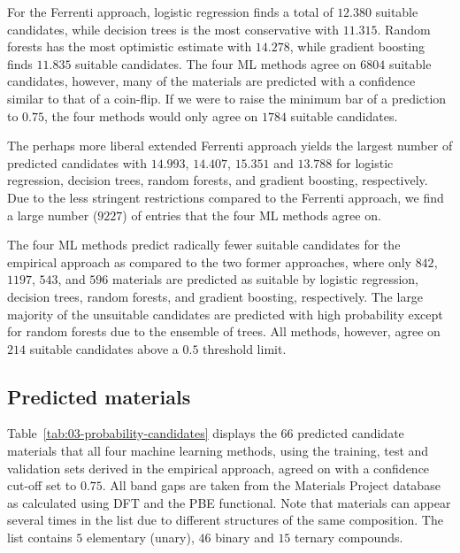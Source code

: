 \documentclass[superscriptaddress,unsortedaddress,
 amsmath,amssymb,
 aps,
]{revtex4-2}
\begin{document}
For the Ferrenti approach, logistic regression finds a total of $12.380$ suitable candidates, while decision trees is the most conservative with $11.315$. Random forests has the most optimistic estimate with $14.278$, while gradient boosting finds $11.835$ suitable candidates. The four ML methods agree on $6804$ suitable candidates,  however, many of the materials are predicted with a confidence similar to that of a coin-flip.
If we were to raise the minimum bar of a prediction to  
$0.75$, the four methods would only agree on $1784$ suitable candidates. 

The perhaps more liberal extended Ferrenti approach yields the largest number of predicted candidates with $14.993$, $14.407$, $15.351$ and $13.788$ for logistic regression, decision trees, random forests, and gradient boosting, respectively. Due to the less stringent restrictions compared to the Ferrenti approach, we find a large number ($9227$) of entries that the four ML methods  agree on.

The four ML methods predict radically fewer suitable candidates for the empirical approach as compared to the two former approaches, where only $842$, $1197$, $543$, and $596$ materials are predicted as suitable by logistic regression, decision trees, random forests, and gradient boosting, respectively. The large majority of the unsuitable candidates are predicted with high probability except for random forests due to the ensemble of trees. All methods, however, agree on $214$ suitable candidates above a $0.5$ threshold limit.  

\subsection*{Predicted materials}

Table~\ref{tab:03-probability-candidates} displays the $66$ predicted candidate materials that all four machine learning methods, using the training, test and validation sets derived in the empirical approach, agreed on with a confidence cut-off set to $0.75$. All band gaps are taken from the Materials Project database as calculated using DFT and the PBE functional. Note that materials can appear several times in the list due  to  different  structures of the same composition. The  list  contains $5$ elementary (unary), $46$ binary and  $15$ ternary compounds. 


\end{document}
